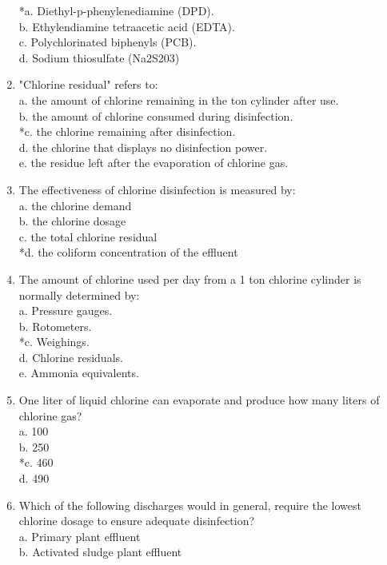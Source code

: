 \begin{enumerate}
*a. Diethyl-p-phenylenediamine (DPD). \\
b. Ethylendiamine tetraacetic acid (EDTA). \\
c. Polychlorinated biphenyls (PCB). \\
d. Sodium thiosulfate (Na2S203) \\
\item "Chlorine residual" refers to: \\
a. the amount of chlorine remaining in the ton cylinder after use. \\
b. the amount of chlorine consumed during disinfection. \\
*c. the chlorine remaining after disinfection. \\
d. the chlorine that displays no disinfection power. \\
e. the residue left after the evaporation of chlorine gas. \\
\item The effectiveness of chlorine disinfection is measured by: \\
a. the chlorine demand \\
b. the chlorine dosage \\
c. the total chlorine residual \\
*d. the coliform concentration of the effluent \\
\item The amount of chlorine used per day from a 1 ton chlorine cylinder is normally determined by: \\
a. Pressure gauges. \\
b. Rotometers. \\
*c. Weighings. \\
d. Chlorine residuals. \\
e. Ammonia equivalents. \\
\item One liter of liquid chlorine can evaporate and produce how many liters of chlorine gas? \\
a. 100 \\
b. 250 \\
*c. 460 \\
d. 490 \\
\item Which of the following discharges would in general, require the lowest chlorine dosage to ensure adequate disinfection? \\
a. Primary plant effluent \\
b. Activated sludge plant effluent \\

\end{enumerate}
